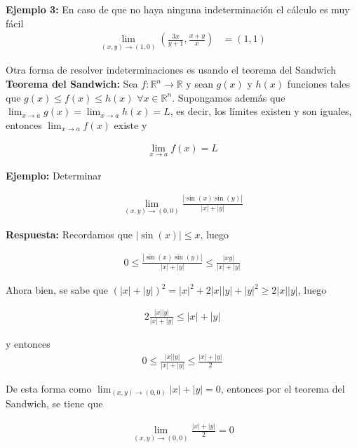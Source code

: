 \documentclass{article}
\theoremstyle{definition}
\begin{document}
\textbf{Ejemplo 3: } En caso de que no haya ninguna indeterminación el cálculo es muy fácil \\


\begin{align*}
\displaystyle \lim_{(x,y) \to (1,0)}   \left( \frac{ 3x}{y+1} , \frac{x+y}{x}\right)    &=  \left( 1 , 1\right) 
\end{align*}

Otra forma de resolver indeterminaciones es usando el teorema del Sandwich \\

\textbf{Teorema del Sandwich:} Sea $f: \mathbb{R}^n \to \mathbb{R}$ y sean $g(x)$ y $h(x)$ funciones tales que $g(x) \leq f(x) \leq h(x)$ $\forall x \in \mathbb{R}^n$. Supongamos adem\'as que $\displaystyle \lim_{x \to a} g(x) = \lim_{x \to a} h(x) = L$, es decir, los l\'imites existen y son iguales, entonces $\displaystyle\lim_{x \to a} f(x)$ existe y

\begin{align*}
    \lim_{x \to a} f(x) = L
\end{align*}

\textbf{Ejemplo:} Determinar

\begin{align*}
    \lim_{(x,y) \to (0,0)} \frac{|\sin(x)\sin(y)|}{|x|+|y|}
\end{align*}

\textbf{Respuesta:} Recordamos que $|\sin(x)| \leq x$, luego


\begin{align*}
    0 \leq \frac{|\sin(x)\sin(y)|}{|x|+|y|} \leq \frac{|xy|}{|x|+|y|}
\end{align*}

Ahora bien, se sabe que $(|x|+|y|)^2 = |x|^2+2|x||y|+|y|^2 \geq 2|x||y|$, luego 

\begin{align*}
    2\frac{|x||y|}{|x|+|y|} \leq |x|+|y|
\end{align*}

y entonces
\begin{align*}
    0 \leq \frac{|x||y|}{|x|+|y|} \leq \frac{|x|+|y|}{2}
\end{align*}

De esta forma  como $\displaystyle \lim_{(x,y) \to (0,0)} |x|+|y| = 0$, entonces por el teorema del Sandwich, se tiene que

\begin{align*}
    \lim_{(x,y) \to (0,0)} \frac{|x|+|y|}{2} = 0
\end{align*}
\end{document}
